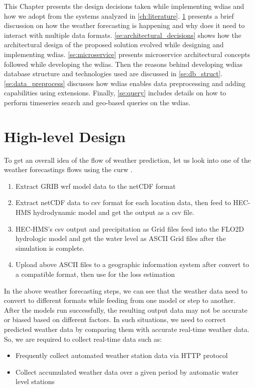 This Chapter presents the design decisions taken while implementing \acrfull{wdias} and how we adopt from the systems analyzed in \ref{ch:literature}.
\cref{se:high_level_design} presents a brief discussion on how  the weather forecasting is happening and why does it need to interact with multiple data formats.
\cref{se:architectural_decisions} shows how the architectural design of the proposed solution evolved while designing and implementing \acrshort{wdias}.
\cref{se:microservice} presents microservice architectural concepts followed while developing the \acrshort{wdias}. Then the reasons behind developing \acrshort{wdias} database structure and technologies used are discussed in  \cref{se:db_struct}.
\cref{se:data_preprocess} discusses how \acrshort{wdias} enables data preprocessing and adding capabilities using extensions. Finally, \cref{se:query} includes details on how to perform timeseries search and geo-based queries on the \acrshort{wdias}.


\section{High-level Design}
\label{se:high_level_design}

To get an overall idea of the flow of weather prediction, let us look into one of the weather forecastings flows using the \acrshort{curw} \cite{CUrWSL2017SL}.

\begin{enumerate}
    \item Extract \acrshort{GRIB} \acrshort{wrf} model data to the \acrshort{netCDF} format
    \item Extract \acrshort{netCDF} data to \acrshort{csv} format for each location data, then feed to HEC-HMS hydrodynamic model and get the output as a \acrshort{csv} file.
    \item HEC-HMS's \acrshort{csv} output and precipitation as Grid files feed into the FLO2D hydrologic model and get the water level as ASCII Grid files after the simulation is complete.
    \item Upload above ASCII files to a geographic information system after convert to a compatible format, then use for the loss estimation
\end{enumerate}
    
In the above weather forecasting steps, we can see that the weather data need to convert to different formats while feeding from one model or step to another. After the models run successfully, the resulting output data may not be accurate or biased based on different factors. In such situations, we need to correct predicted weather data by comparing them with accurate real-time weather data. So, we are required to collect real-time data such as:
\begin{itemize}
    \item Frequently collect automated weather station data via HTTP protocol
    \item Collect accumulated weather data over a given period by automatic water level stations
\end{itemize}


